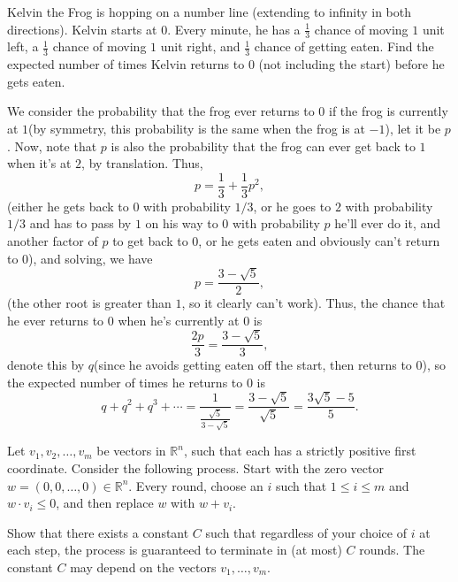 \begin{question}[name={2017 HMMT, November Guts, \href{https://artofproblemsolving.com/community/c129h1387221p7718382}{Problem 26}}]
	Kelvin the Frog is hopping on a number line (extending to infinity in both directions). Kelvin starts at $0$. Every minute, he has a $\frac{1}{3}$ chance of moving $1$ unit left, a $\frac{1}{3}$ chance of moving $1$ unit right, and $\frac{1}{3}$ chance of getting eaten. Find the expected number of times Kelvin returns to $0$ (not including the start) before he gets eaten.
\end{question}

\begin{solution}[name={Solution by Shaddoll}]
	We consider the probability that the frog ever returns to $0$ if the frog is currently at $1$(by symmetry, this probability is the same when the frog is at $-1$), let it be $p$. Now, note that $p$ is also the probability that the frog can ever get back to $1$ when it's at $2$, by translation. Thus, $$p=\frac{1}{3} + \frac{1}{3}p^2,$$(either he gets back to $0$ with probability ${1}/{3}$, or he goes to $2$ with probability ${1}/{3}$ and has to pass by $1$ on his way to $0$ with probability $p$ he'll ever do it, and another factor of $p$ to get back to $0$, or he gets eaten and obviously can't return to $0$), and solving, we have $$p = \frac{3-\sqrt{5}}{2},$$(the other root is greater than $1$, so it clearly can't work). Thus, the chance that he ever returns to $0$ when he's currently at $0$ is $$\frac{2p}{3} = \frac{3-\sqrt{5}}{3},$$ denote this by $q$(since he avoids getting eaten off the start, then returns to $0$), so the expected number of times he returns to $0$ is $$q+q^2+q^3+\cdots= \frac{1}{\frac{\sqrt{5}}{3-\sqrt{5}}} = \frac{3-\sqrt{5}}{\sqrt{5}} = \frac{3\sqrt{5}-5}{5}.$$
\end{solution}




\begin{question}[name={2017 HMIC, \href{https://artofproblemsolving.com/community/c6h1427494p8042809}{Problem 3}}]
	Let $v_1, v_2, \ldots, v_m$ be vectors in $\mathbb{R}^n$, such that each has a strictly positive first coordinate. Consider the following process. Start with the zero vector $w = (0, 0, \ldots, 0) \in \mathbb{R}^n$. Every round, choose an $i$ such that $1 \le i \le m$ and $w \cdot v_i \le 0$, and then replace $w$ with $w + v_i$.
	
	Show that there exists a constant $C$ such that regardless of your choice of $i$ at each step, the process is guaranteed to terminate in (at most) $C$ rounds. The constant $C$ may depend on the vectors $v_1, \ldots, v_m$.
\end{question}

